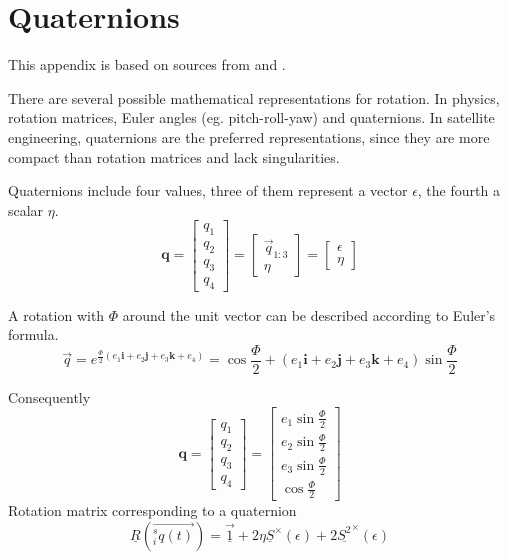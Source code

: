 \chapter{Quaternions } \label{chap:A}
This appendix is based on sources from \cite{SADC} and \cite{Kui}.

There are several possible mathematical representations for rotation. In physics, rotation matrices, Euler angles (eg. pitch-roll-yaw) and quaternions. In satellite engineering, quaternions are the preferred representations, since they are more compact than rotation matrices and lack singularities.

Quaternions include four values, three of them represent a vector \textbf{$\epsilon$}, the fourth a scalar $\eta$. 
\begin{equation}
\textbf{q} =
\left[ 
\begin{array}{cccc}
q_1 \\
q_2 \\  
q_3 \\
q_4 
\end{array}
\right] 
= 
\left[ 
\begin{array}{cccc}
\vec{q}_{1:3} \\
\eta
\end{array}
\right]
=
\left[ 
\begin{array}{cccc}
\textbf{$\epsilon$} \\
\eta
\end{array}
\right] 
\end{equation}

A rotation with $\Phi$ around the unit vector can be described according to Euler's formula.
\begin{equation}
\vec q = e^{\frac{\Phi}{2} (e_1 \textbf{i}+ e_2 \textbf{j} + e_3 \textbf{k} + e_4)} = \cos \frac{\Phi}{2} + (e_1 \textbf{i}+ e_2 \textbf{j} + e_3 \textbf{k} +e_4) \sin \frac{\Phi}{2}
\end{equation}

Consequently 
\begin{equation}
\textbf{q} =
\left[ 
\begin{array}{cccc}
q_1 \\
q_2 \\  
q_3 \\
q_4 
\end{array}
\right] 
= 
\left[ 
\begin{array}{cccc}
e_1  \sin \frac{\Phi}{2} \\
e_2  \sin \frac{\Phi}{2} \\  
e_3  \sin \frac{\Phi}{2} \\
\cos \frac{\Phi}{2} 
\end{array}
\right] 
\end{equation}
Rotation matrix corresponding to a quaternion
\begin{equation}
\underline{R}(\vec{^s_i q(t)}) = \underline{\vec 1} + 2 \eta \underline{S} ^\times (\epsilon) + 2 \underline{S^2} ^\times (\epsilon) 
\end{equation}

